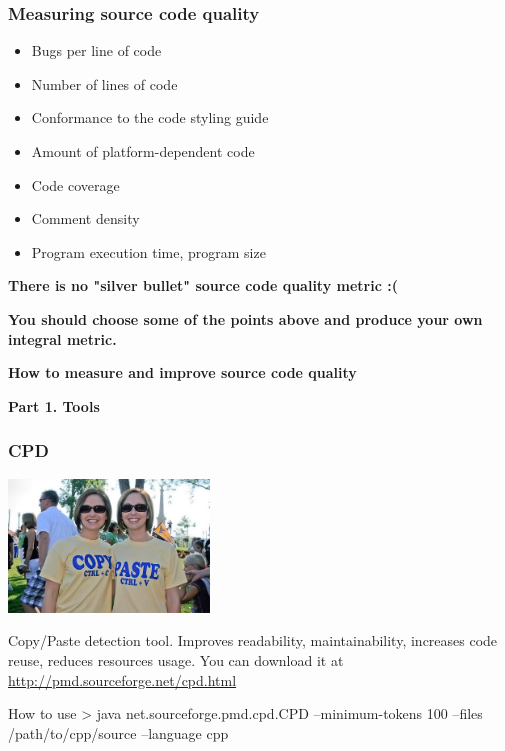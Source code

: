 \documentclass{beamer}
\begin{document}
\begin{frame}
\frametitle{Measuring source code quality}
\begin{itemize}
\item Bugs per line of code
\item Number of lines of code
\item Conformance to the code styling guide
\item Amount of platform-dependent code
\item Code coverage
\item Comment density
\item Program execution time, program size
\end{itemize}
\begin{center}
\textbf{There is no "silver bullet" source code quality metric :(}

\textbf{You should choose some of the points above and produce your own integral metric.}
\end{center}
\end{frame}

\begin{frame}
\begin{block}{\begin{center}\Large\textbf{How to measure and improve source code quality}\end{center}}
\begin{center}
\textbf{Part 1. Tools}
\end{center}
\end{block}
\end{frame}

\begin{frame}
\frametitle{CPD}
\begin{center}
\includegraphics[width=0.4\textwidth]{img/copy-paste}
\end{center}
Copy/Paste detection tool. Improves readability, maintainability, increases code reuse, reduces resources usage. You can download it at \url{http://pmd.sourceforge.net/cpd.html}
\begin{exampleblock}{How to use}
> java net.sourceforge.pmd.cpd.CPD --minimum-tokens 100 --files /path/to/cpp/source --language cpp
\end{exampleblock}
\end{frame}
\end{document}
